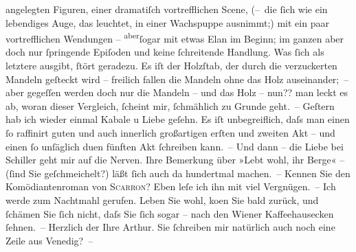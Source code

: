 \begin{ledgroupsized}[t]{13cm}
               angelegten Figuren, einer dramatiſch {\pb}vortrefflichen
               Scene, (– die \introOben{}ſich\introOben{} wie ein lebendiges Auge, das leuchtet,
                   in einer Wachspuppe ausnimmt;) mit ein
               paar vortrefflichen Wendungen – \substVorne{}\textsuperscript{aber}\substDazwischen{}ſogar\substHinten{} mit etwas Elan im Beginn; im ganzen aber doch nur ſpringende Epiſoden und
               keine ſchreitende Handlung. Was ſich als letztere ausgibt, ſtört geradezu. Es iſt der
               Holzſtab, der durch die verzuckerten Mandeln geſteckt wird – freilich fallen die
               Mandeln ohne das Holz auseinander; – aber gegeſſen werden doch nur die Mandeln – und
               das Holz – nun?? man leckt es ab, woran dieser Vergleich, ſcheint mir, {\pb}ſchmählich zu Grunde geht. –\pend
           \pstart
           Geſtern hab ich wieder einmal Kabale u Liebe
               geſehn. Es iſt unbegreiflich, daſs man einen ſo raffinirt guten und auch innerlich
               großartigen erſten und zweiten Akt – und einen ſo unſäglich du{\geminationm}en fünften Akt ſchreiben kann. – Und dann – die Liebe
               bei Schiller geht mir auf die Nerven. Ihre
               Bemerkung über »Lebt wohl, ihr Berge« – (ſind Sie geſchmeichelt?) läßt ſich auch da
               hundertmal machen. –\pend
           \pstart
           Kennen Sie den Komödiantenroman von \textsc{Scarron}? Eben leſe ich ihn mit viel Vergnügen. – Ich werde zum Nachtmahl {\pb}gerufen. Leben Sie wohl, ko{\geminationm}en Sie bald zurück, und ſchämen Sie ſich nicht, daſs
               Sie ſich sogar – nach den Wiener Kaffeehausecken
               ſehnen. –\pend
           \pstart Herzlich der Ihre \spacefill\mbox{Arthur.}\pend{}\pstart
           \noindent{}Sie ſchreiben mir natürlich auch noch eine Zeile aus Venedig? –\pend
           
         
         \endnumbering{}\end{ledgroupsized}  \newcommand{\dateiname}{L00392}\newcommand{\titel}{Arthur Schnitzler an Richard Beer-Hofmann, 26. 10. 1894}\newcommand{\editorInnen}{Martin Anton Müller und Gerd-Hermann Susen}
      